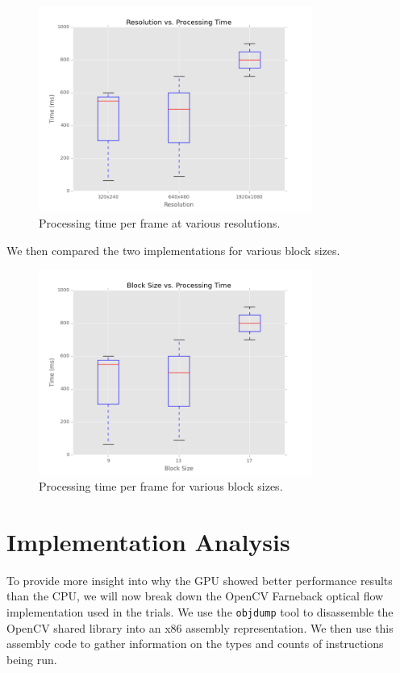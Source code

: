\documentclass[12pt,letterpaper]{article}
\begin{document}
\begin{figure}[H]
  \centering
    \includegraphics[width=0.8\textwidth]{resolution.png}
  \caption{Processing time per frame at various resolutions.}
\end{figure}

We then compared the two implementations for various block sizes.

\begin{figure}[H]
  \centering
    \includegraphics[width=0.8\textwidth]{block_size.png}
  \caption{Processing time per frame for various block sizes.}
\end{figure}

\section{Implementation Analysis}
To provide more insight into why the GPU showed better performance results than
the CPU, we will now break down the OpenCV Farneback optical flow implementation
used in the trials. We use the \texttt{objdump} tool to disassemble the OpenCV
shared library into an x86 assembly representation. We then use this assembly
code to gather information on the types and counts of instructions being run.
\end{document}
